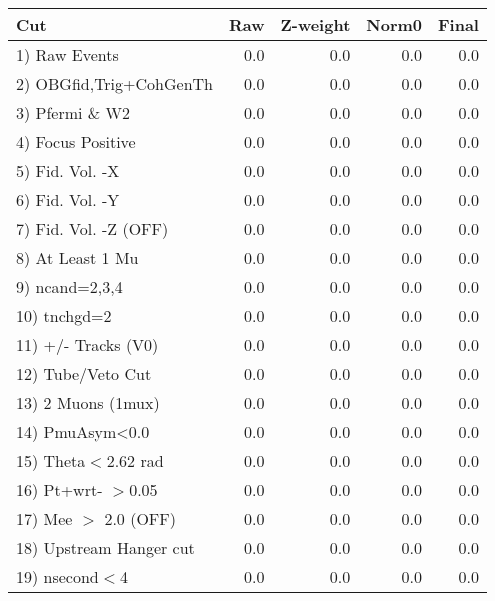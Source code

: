  \begin{table}[h!]\centering
 \begin{tabular}{||l||r|r|r|r||}
 \hline
 \hline
 Cut & Raw & Z-weight & Norm0 & Final \\
 \hline
  1) Raw Events           &         0.0 &         0.0 &         0.0 &         0.0 \\
  2) OBGfid,Trig+CohGenTh &         0.0 &         0.0 &         0.0 &         0.0 \\
  3) Pfermi \& W2         &         0.0 &         0.0 &         0.0 &         0.0 \\
  4) Focus Positive       &         0.0 &         0.0 &         0.0 &         0.0 \\
  5) Fid. Vol. -X         &         0.0 &         0.0 &         0.0 &         0.0 \\
  6) Fid. Vol. -Y         &         0.0 &         0.0 &         0.0 &         0.0 \\
  7) Fid. Vol. -Z (OFF)   &         0.0 &         0.0 &         0.0 &         0.0 \\
  8) At Least 1 Mu        &         0.0 &         0.0 &         0.0 &         0.0 \\
  9) ncand=2,3,4          &         0.0 &         0.0 &         0.0 &         0.0 \\
 10) tnchgd=2             &         0.0 &         0.0 &         0.0 &         0.0 \\
 11) +/- Tracks (V0)      &         0.0 &         0.0 &         0.0 &         0.0 \\
 12) Tube/Veto Cut        &         0.0 &         0.0 &         0.0 &         0.0 \\
 13) 2 Muons (1mux)       &         0.0 &         0.0 &         0.0 &         0.0 \\
 14) PmuAsym<0.0          &         0.0 &         0.0 &         0.0 &         0.0 \\
 15) Theta$<$2.62 rad     &         0.0 &         0.0 &         0.0 &         0.0 \\
 16) Pt+wrt- $>$0.05      &         0.0 &         0.0 &         0.0 &         0.0 \\
 17) Mee $>$ 2.0  (OFF)   &         0.0 &         0.0 &         0.0 &         0.0 \\
 18) Upstream Hanger cut  &         0.0 &         0.0 &         0.0 &         0.0 \\
 19) nsecond$<$4          &         0.0 &         0.0 &         0.0 &         0.0 \\

\end{tabular}
\end{table}
